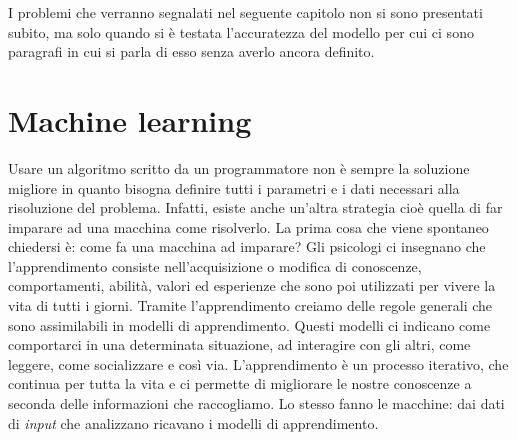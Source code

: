 I problemi che verranno segnalati nel seguente capitolo non si sono presentati subito, ma solo quando si è testata l'accuratezza del modello per cui ci sono paragrafi in cui si parla di esso senza averlo ancora definito.
\section{Machine learning}
Usare un algoritmo scritto da un programmatore non è sempre la soluzione migliore in quanto bisogna definire tutti i parametri e i dati necessari alla risoluzione del problema. Infatti, esiste anche un'altra strategia cioè quella di far imparare ad una macchina come risolverlo. La prima cosa che viene spontaneo chiedersi è: come fa una macchina ad imparare? Gli psicologi ci insegnano che l’apprendimento consiste nell’acquisizione o modifica di conoscenze, comportamenti, abilità, valori ed esperienze che sono poi utilizzati per vivere la vita di tutti i giorni. Tramite l’apprendimento creiamo delle regole generali che sono assimilabili in modelli di apprendimento. Questi modelli ci indicano come comportarci in una determinata situazione, ad interagire con gli altri, come leggere, come socializzare e così via. L’apprendimento è un processo iterativo, che continua per tutta la vita e ci permette di migliorare le nostre conoscenze a seconda delle informazioni che raccogliamo. Lo stesso fanno le macchine: dai dati di \textit{input} che analizzano ricavano i modelli di apprendimento. 
